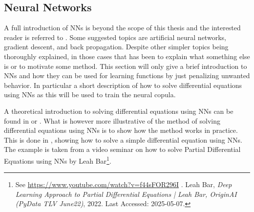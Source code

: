 \subsection{Neural Networks}
A full introduction of \gls{NN}s is beyond the scope of this thesis and the interested reader is referred to . Some suggested topics are artificial neural networks, gradient descent, and back propagation. Despite other simpler topics being thoroughly explained, in those cases that has been to explain what something else is or to motivate some method. This section will only give a brief introduction to \gls{NN}s and how they can be used for learning functions by just penalizing unwanted behavior. In particular a short description of how to solve differential equations using \gls{NN}s as this will be used to train the neural copula.

A theoretical introduction to solving differential equations using \gls{NN}s can be found in  or . What is however more illustrative of the method of solving differential equations using \gls{NN}s is to show how the method works in practice. This is done in , showing how to solve a simple differential equation using \gls{NN}s. The example is taken from a video seminar on how to solve Partial Differential Equations using \gls{NN}s by Leah Bar\footnote{See \url{https://www.youtube.com/watch?v=f44sFOR296I} . Leah Bar, \textit{Deep Learning Approach to Partial Differential Equations | Leah Bar, OriginAI (PyData TLV June22)}, 2022. Last Accessed: 2025-05-07.}. 

